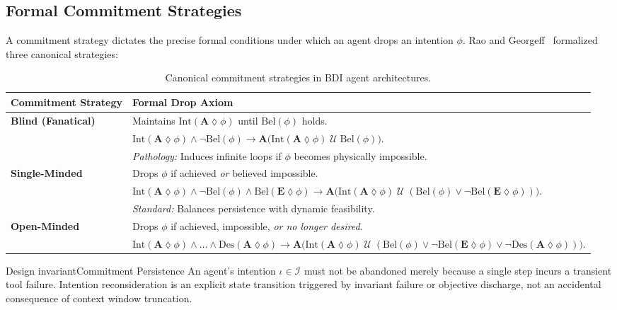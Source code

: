 \subsection{Formal Commitment Strategies}

A commitment strategy dictates the precise formal conditions under which an agent drops an intention $\phi$. Rao and Georgeff~ formalized three canonical strategies:

\begin{table}[H]
\centering
\small
\begin{tabularx}{\textwidth}{lX}
\toprule
\textbf{Commitment Strategy} & \textbf{Formal Drop Axiom} \\
\midrule
\textbf{Blind (Fanatical)} & Maintains $\mathrm{Int}(\mathbf{A}\lozenge \phi)$ until $\mathrm{Bel}(\phi)$ holds. \\
& $\mathrm{Int}(\mathbf{A}\lozenge \phi) \land \neg\mathrm{Bel}(\phi) \to \mathbf{A}\big(\mathrm{Int}(\mathbf{A}\lozenge \phi) \;\mathcal{U}\; \mathrm{Bel}(\phi)\big)$. \\
& \emph{Pathology:} Induces infinite loops if $\phi$ becomes physically impossible. \\
\addlinespace[3pt]
\textbf{Single-Minded} & Drops $\phi$ if achieved \emph{or} believed impossible. \\
& $\mathrm{Int}(\mathbf{A}\lozenge \phi) \land \neg\mathrm{Bel}(\phi) \land \mathrm{Bel}(\mathbf{E}\lozenge \phi) \to \mathbf{A}\big(\mathrm{Int}(\mathbf{A}\lozenge \phi) \;\mathcal{U}\; (\mathrm{Bel}(\phi) \lor \neg\mathrm{Bel}(\mathbf{E}\lozenge \phi))\big)$. \\
& \emph{Standard:} Balances persistence with dynamic feasibility. \\
\addlinespace[3pt]
\textbf{Open-Minded} & Drops $\phi$ if achieved, impossible, \emph{or no longer desired}. \\
& $\mathrm{Int}(\mathbf{A}\lozenge \phi) \land \dots \land \mathrm{Des}(\mathbf{A}\lozenge \phi) \to \mathbf{A}\big(\mathrm{Int}(\mathbf{A}\lozenge \phi) \;\mathcal{U}\; (\mathrm{Bel}(\phi) \lor \neg\mathrm{Bel}(\mathbf{E}\lozenge \phi) \lor \neg\mathrm{Des}(\mathbf{A}\lozenge \phi))\big)$. \\
\bottomrule
\end{tabularx}
\caption{Canonical commitment strategies in BDI agent architectures.}
\label{tab:commitment-strategies}
\end{table}

\begin{pdclaim}{Design invariant}{Commitment Persistence}\label{inv:commitment-persistence}
An agent's intention $\iota \in \mathcal{I}$ must not be abandoned merely because a single step incurs a transient tool failure. Intention reconsideration is an explicit state transition triggered by invariant failure or objective discharge, not an accidental consequence of context window truncation.
\end{pdclaim}

